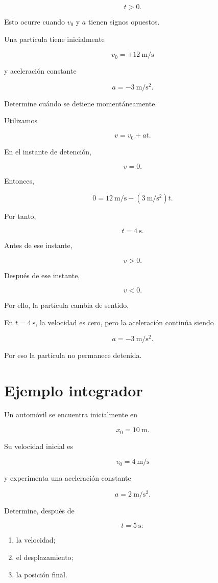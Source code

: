 \[ t>0. \]

Esto ocurre cuando \(v_0\) y \(a\) tienen signos opuestos.


\begin{ejemplo}

Una partícula tiene inicialmente

\[ v_0=+\SI{12}{\meter\per\second} \]

y aceleración constante

\[ a=-\SI{3}{\meter\per\second\squared}. \]

Determine cuándo se detiene momentáneamente.

Utilizamos

\[ v=v_0+at. \]

En el instante de detención,

\[ v=0. \]

Entonces,

\[
0
=
\SI{12}{\meter\per\second}
-
\left(\SI{3}{\meter\per\second\squared}\right)t.
\]

Por tanto,

\[ \boxed{t=\SI{4}{\second}}. \]

Antes de ese instante,

\[ v>0. \]

Después de ese instante,

\[ v<0. \]

Por ello, la partícula cambia de sentido.

\begin{interpretacion}
En \(t=\SI{4}{\second}\), la velocidad es cero, pero la aceleración continúa
siendo

\[ a=-\SI{3}{\meter\per\second\squared}. \]

Por eso la partícula no permanece detenida.
\end{interpretacion}
\end{ejemplo}


\section{Ejemplo integrador}

\begin{ejemplo}

Un automóvil se encuentra inicialmente en

\[ x_0=\SI{10}{\meter}. \]

Su velocidad inicial es

\[ v_0=\SI{4}{\meter\per\second} \]

y experimenta una aceleración constante

\[ a=\SI{2}{\meter\per\second\squared}. \]

Determine, después de

\[ t=\SI{5}{\second}: \]

\begin{enumerate}[label=\alph*)]
    \item la velocidad;
    \item el desplazamiento;
    \item la posición final.
\end{enumerate}
\end{ejemplo}

